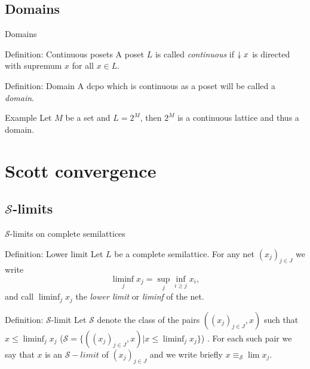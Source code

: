 \documentclass{beamer}
\newcommand{\downdownarrow}{\mathrel{\reflectbox{\rotatebox[origin=c]{90}{$\twoheadleftarrow$}}}}
\begin{document}
\subsection{Domains}
\begin{frame}{Domains}
\begin{block}{Definition: Continuous posets}
A poset $L$ is called \emph{continuous} if $\downdownarrow x$ is directed with supremum $x$ for all $x \in L$.
\end{block}

\begin{block}{Definition: Domain}
A dcpo which is continuous as a poset will be called a \emph{domain}.
\end{block}

\begin{block}{Example}
Let $M$ be a set and $L = 2^M$, then $2^M$ is a continuous lattice and thus a domain.
\end{block}
\end{frame}

\section{Scott convergence}
\subsection{$\mathcal{S}$-limits}
\begin{frame}{$\mathcal{S}$-limits on complete semilattices}
\begin{block}{Definition: Lower limit}
Let $L$ be a complete semilattice. For any net $(x_j)_{j\in J}$ we write
$$\liminf_j x_j = \sup_j \inf_{i \geq j} x_i,$$
and call $\liminf_j x_j$ the \emph{lower limit} or \emph{liminf} of the net.
\end{block}

\begin{block}{Definition: $\mathcal{S}$-limit}
Let $\mathcal{S}$ denote the class of the pairs $((x_j)_{j\in J}, x)$ such that $x \leq \liminf_j x_j$ ($\mathcal{S} = \{((x_j)_{j\in J}, x) | x \leq \liminf_j x_j \}$) . For each such pair we say that $x$ is an $\mathcal{S}-limit$ of $(x_j)_{j \in J}$ and we write briefly $x \equiv_{\mathcal{S}} \lim x_j$.
\end{block}
\end{frame}
\end{document}
